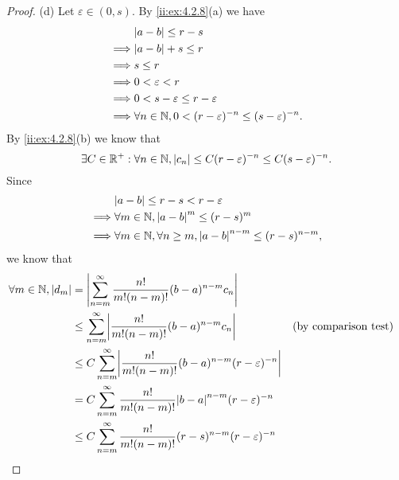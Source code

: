 \begin{proof}{(d)}
  Let \(\varepsilon \in (0, s)\).
  By \cref{ii:ex:4.2.8}(a) we have
  \begin{align*}
             & \abs{a - b} \leq r - s                                                    \\
    \implies & \abs{a - b} + s \leq r                                                    \\
    \implies & s \leq r                                                                  \\
    \implies & 0 < \varepsilon < r                                                       \\
    \implies & 0 < s - \varepsilon \leq r - \varepsilon                                  \\
    \implies & \forall n \in \N, 0 < (r - \varepsilon)^{-n} \leq (s - \varepsilon)^{-n}.
  \end{align*}
  By \cref{ii:ex:4.2.8}(b) we know that
  \[
    \exists C \in \mathbb{R}^+ : \forall n \in \mathbb{N}, \left\lvert c_n\right\rvert \leq C (r - \varepsilon)^{-n} \leq C (s - \varepsilon)^{-n}.
  \]
  Since
  \begin{align*}
             & \abs{a - b} \leq r - s < r - \varepsilon                                      \\
    \implies & \forall m \in \N, \abs{a - b}^{m} \leq (r - s)^m                              \\
    \implies & \forall m \in \N, \forall n \geq m, \abs{a - b}^{n - m} \leq (r - s)^{n - m},
  \end{align*}
  we know that
  \begin{align*}
    \forall m \in \N, \abs{d_m} & = \abs{\sum_{n = m}^\infty \dfrac{n!}{m! (n - m)!} (b - a)^{n - m} c_n}                                                          \\
                                & \leq \sum_{n = m}^\infty \abs{\dfrac{n!}{m! (n - m)!} (b - a)^{n - m} c_n}                      &  & \text{(by comparison test)} \\
                                & \leq C \sum_{n = m}^\infty \abs{\dfrac{n!}{m! (n - m)!} (b - a)^{n - m} (r - \varepsilon)^{-n}}                                  \\
                                & = C \sum_{n = m}^\infty \dfrac{n!}{m! (n - m)!} \abs{b - a}^{n - m} (r - \varepsilon)^{-n}                                       \\
                                & \leq C \sum_{n = m}^\infty \dfrac{n!}{m! (n - m)!} (r - s)^{n - m} (r - \varepsilon)^{-n}                                        \\

\end{align*}
\end{proof}
